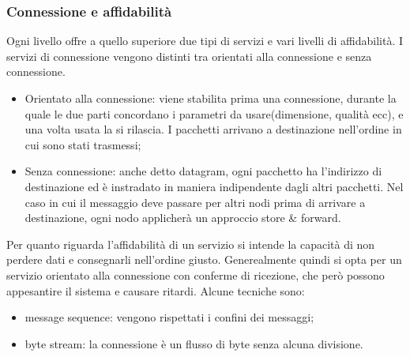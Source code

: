 \documentclass{subfiles}
\begin{document}
\subsubsection{Connessione e affidabilità}
        Ogni livello offre a quello superiore due tipi di servizi e vari livelli di affidabilità. I servizi di connessione vengono 
        distinti tra orientati alla connessione e senza connessione.
    \begin{itemize}
        \item Orientato alla connessione: viene stabilita prima una connessione, durante la quale le due parti concordano i parametri da 
        usare(dimensione, qualità ecc), e una volta usata la si rilascia. I pacchetti arrivano a destinazione nell'ordine in cui sono 
        stati trasmessi;
        \item Senza connessione: anche detto datagram, ogni pacchetto ha l'indirizzo di destinazione ed è instradato in maniera 
        indipendente dagli altri pacchetti. Nel caso in cui il messaggio deve passare per altri nodi prima di arrivare a destinazione, 
        ogni nodo applicherà un approccio store \& forward.
    \end{itemize}
    Per quanto riguarda l'affidabilità di un servizio si intende la capacità di non perdere dati e consegnarli nell'ordine giusto. 
    Generealmente quindi si opta per un servizio orientato alla connessione con conferme di ricezione, che però possono appesantire 
    il sistema e causare ritardi. Alcune tecniche sono:
    \begin{itemize}
        \item message sequence: vengono rispettati i confini dei messaggi;
        \item byte stream: la connessione è un flusso di byte senza alcuna divisione.
    \end{itemize}
\end{document}

